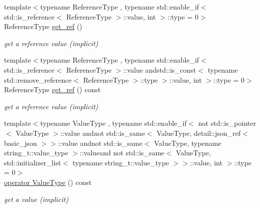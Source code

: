 \begin{DoxyCompactItemize}
{\footnotesize template$<$typename Reference\+Type , typename std\+::enable\+\_\+if$<$ std\+::is\+\_\+reference$<$ Reference\+Type $>$\+::value, int $>$\+::type  = 0$>$ }\\Reference\+Type \hyperlink{classnlohmann_1_1basic__json_afbd800010b67619463c0fce6e74f7878}{get\+\_\+ref} ()
\begin{DoxyCompactList}\small\item\em get a reference value (implicit) \end{DoxyCompactList}\item 
{\footnotesize template$<$typename Reference\+Type , typename std\+::enable\+\_\+if$<$ std\+::is\+\_\+reference$<$ Reference\+Type $>$\+::value andstd\+::is\+\_\+const$<$ typename std\+::remove\+\_\+reference$<$ Reference\+Type $>$\+::type $>$\+::value, int $>$\+::type  = 0$>$ }\\Reference\+Type \hyperlink{classnlohmann_1_1basic__json_a87e9e9cb2556fabfe042a4fabfc2c952}{get\+\_\+ref} () const 
\begin{DoxyCompactList}\small\item\em get a reference value (implicit) \end{DoxyCompactList}\item 
{\footnotesize template$<$typename Value\+Type , typename std\+::enable\+\_\+if$<$ not std\+::is\+\_\+pointer$<$ Value\+Type $>$\+::value andnot std\+::is\+\_\+same$<$ Value\+Type, detail\+::json\+\_\+ref$<$ basic\+\_\+json $>$$>$\+::value andnot std\+::is\+\_\+same$<$ Value\+Type, typename string\+\_\+t\+::value\+\_\+type $>$\+::valueand not std\+::is\+\_\+same$<$ Value\+Type, std\+::initializer\+\_\+list$<$ typename string\+\_\+t\+::value\+\_\+type $>$$>$\+::value, int $>$\+::type  = 0$>$ }\\\hyperlink{classnlohmann_1_1basic__json_a9cbcce20b78708de25c7ccb60c4ca7c5}{operator Value\+Type} () const 
\begin{DoxyCompactList}\small\item\em get a value (implicit) \end{DoxyCompactList}\end{DoxyCompactItemize}
